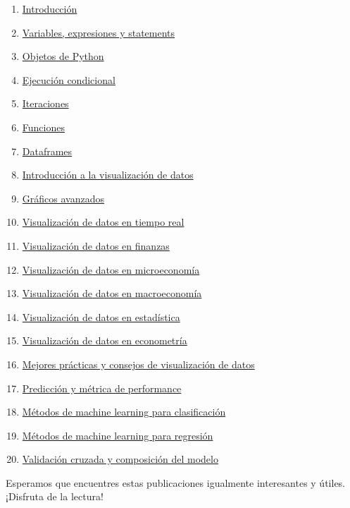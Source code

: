 \documentclass[
  a4paper,
]{article}
\begin{document}
\begin{enumerate}
\def\labelenumi{\arabic{enumi}.}
\item
  \href{../2023-06-22-01-introduccion-a-python/index.qmd}{Introducción}
\item
  \href{../2023-06-23-02-variables-expresiones-y-statements-con-python/index.qmd}{Variables,
  expresiones y statements}
\item
  \href{../2023-06-24-03-objetos-de-python/index.qmd}{Objetos de Python}
\item
  \href{../2023-06-25-04-ejecucion-condicional-con-python/index.qmd}{Ejecución
  condicional}
\item
  \href{../2023-06-26-05-iteraciones-con-python/index.qmd}{Iteraciones}
\item
  \href{../2023-06-27-06-funciones-con-python/index.qmd}{Funciones}
\item
  \href{../2023-06-28-07-dataframes-con-python/index.qmd}{Dataframes}
\item
  \href{../2023-06-29-introduccion-a-la-visualizacion-de-datos-con-python/index.qmd}{Introducción
  a la visualización de datos}
\item
  \href{../2023-06-30-graficos-avanzados-con-python/index.qmd}{Gráficos
  avanzados}
\item
  \href{../2023-07-01-visualizacion-de-datos-en-tiempo-real-con-python/index.qmd}{Visualización
  de datos en tiempo real}
\item
  \href{../2023-07-02-visualizacion-de-datos-en-finanzas-con-python/index.qmd}{Visualización
  de datos en finanzas}
\item
  \href{../2023-07-03-visualizacion-de-datos-en-microeconomia-con-python/index.qmd}{Visualización
  de datos en microeconomía}
\item
  \href{../2023-07-04-visualizacion-de-datos-en-macroeconomia-con-python/index.qmd}{Visualización
  de datos en macroeconomía}
\item
  \href{../2023-07-05-visualizacion-de-datos-en-estadistica-con-python/index.qmd}{Visualización
  de datos en estadística}
\item
  \href{../2023-07-06-visualizacion-de-datos-en-econometria-con-python/index.qmd}{Visualización
  de datos en econometría}
\item
  \href{../2023-07-07-mejores-practicas-y-consejos-de-visualizacion-de-datos-con-python/index.qmd}{Mejores
  prácticas y consejos de visualización de datos}
\item
  \href{../2023-07-08-08-prediccion-y-metrica-de-performance-con-python/index.qmd}{Predicción
  y métrica de performance}
\item
  \href{../2023-07-09-09-metodos-de-machine-learning-para-clasificacion-con-python/index.qmd}{Métodos
  de machine learning para clasificación}
\item
  \href{../2023-07-10-10-metodos-de-machine-learning-para-regresion-con-python/index.qmd}{Métodos
  de machine learning para regresión}
\item
  \href{../2023-07-11-11-validacion-cruzada-y-composicion-del-modelo-con-python/index.qmd}{Validación
  cruzada y composición del modelo}
\end{enumerate}

Esperamos que encuentres estas publicaciones igualmente interesantes y
útiles. ¡Disfruta de la lectura!


\printbibliography
\end{document}
